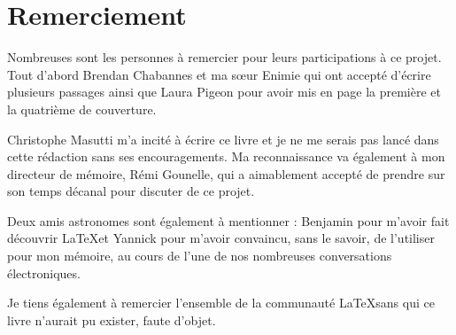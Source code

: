 \section*{Remerciement}

Nombreuses sont les personnes à remercier pour leurs participations à ce projet. Tout d'abord Brendan Chabannes et ma sœur Enimie qui ont accepté d'écrire plusieurs passages ainsi que Laura Pigeon pour avoir mis en page la première et la quatrième de couverture.

Christophe Masutti m'a incité à écrire ce livre et je ne me serais pas lancé dans cette rédaction sans ses encouragements. Ma reconnaissance va également à mon directeur de mémoire, Rémi Gounelle, qui a aimablement accepté de prendre sur son temps décanal pour discuter de ce projet.

Deux amis astronomes sont également à mentionner : Benjamin pour m'avoir fait découvrir  \LaTeX et Yannick pour m'avoir convaincu, sans le savoir, de l'utiliser pour mon mémoire, au cours de l'une de nos nombreuses conversations électroniques.

Je tiens également à remercier l'ensemble de la communauté \LaTeX sans qui ce livre n'aurait pu exister, faute d'objet. 


